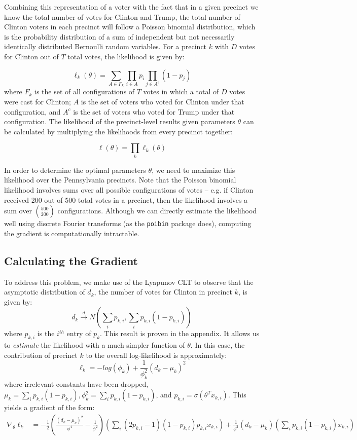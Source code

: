 \documentclass[10pt, letterpaper]{article}
\begin{document}
Combining this representation of a voter with the fact that in a given precinct we know the total number of votes for Clinton and Trump, the total number of Clinton voters in each precinct will follow a Poisson binomial distribution, which is the probability distribution of a sum of independent but not necessarily identically distributed Bernoulli random variables\cite{Poibi}. For a precinct $k$ with $D$ votes for Clinton out of $T$ total votes, the likelihood is given by:

$$\ell_k(\theta) = \sum_{A \in F_k} \prod_{i \in A} p_i \prod_{j \in A^c}(1 - p_j)$$
where $F_k$ is the set of all configurations of $T$ votes in which a total of $D$ votes were cast for Clinton; $A$ is the set of voters who voted for Clinton under that configuration, and $A^c$ is the set of voters who voted for Trump under that configuration. The likelihood of the precinct-level results given parameters $\theta$ can be calculated by multiplying the likelihoods from every precinct together:

$$\ell(\theta) = \prod_k \ell_k(\theta)$$

In order to determine the optimal parameters $\theta$, we need to maximize this likelihood over the Pennsylvania precincts. Note that the Poisson binomial likelihood involves sums over all possible configurations of votes -- e.g. if Clinton received 200 out of 500 total votes in a precinct, then the likelihood involves a sum over $500 \choose 200$ configurations. Although we can directly estimate the likelihood well using discrete Fourier transforms (as the \texttt{poibin} package does\cite{PoibiGithub}), computing the gradient is computationally intractable.

\subsection{Calculating the Gradient}

To address this problem, we make use of the Lyapunov CLT\cite{LyapunovCondition} to observe that the asymptotic distribution of $d_k$, the number of votes for Clinton in precinct $k$, is given by: 
\[ d_k \stackrel{d} \longrightarrow N \left(\sum_{i} p_{k,i}, \sum_{i} p_{k, i}(1-p_{k, i}) \right) \] 
where $p_{k, i}$ is the $i^{th}$ entry of $p_k$. This result is proven in the appendix. It allows us to \emph{estimate} the likelihood with a much simpler function of $\theta$. In this case, the contribution of precinct $k$ to the overall log-likelihood is approximately: 
\[ \ell_k = -log \left( \phi_k\right) + \frac{1}{\phi_k^2} \left( d_k -\mu_k \right)^2  \] 
where irrelevant constants have been dropped, $\mu_k =  \sum_{i} p_{k, i}(1-p_{k, i}), \phi_k^2 = \sum_{i} p_{k, i}(1-p_{k, i})$, and $p_{k, i} = \sigma(\theta^T x_{k, i})$. This yields a gradient of the form: 
\begin{align*}
\nabla_{\theta} \ell_k &=  -\frac{1}{2} \left(\frac{(d_k - \mu_k)^2}{\phi^4} - \frac{1}{\phi^2} \right) \left( \sum_{i} (2 p_{k, i} - 1)(1-p_{k, i})p_{k, i}x_{k, i} \right) + \frac{1}{\phi^2} (d_k - \mu_k) \left( \sum_i p_{k, i} (1 - p_{k, i}) x_{k, i} \right)
\end{align*}
\end{document}
